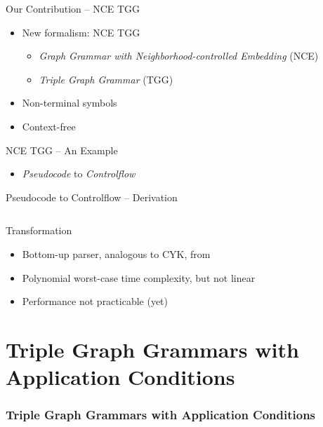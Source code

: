 \documentclass[usenames,dvipsnames]{beamer}
\begin{document}
	\begin{frame}{Our Contribution -- NCE TGG}
		\begin{itemize}
			\item New formalism: NCE TGG
			\begin{itemize}
				\item \emph{Graph Grammar with Neighborhood-controlled Embedding} (NCE) \cite{janssens1982graph}
				\item \emph{Triple Graph Grammar} (TGG) \cite{schurr1994specification}
			\end{itemize}
			\item Non-terminal symbols
			\item Context-free
		\end{itemize}
	\end{frame}
	
	\begin{frame}{NCE TGG -- An Example}
		\begin{itemize}
			\item \emph{Pseudocode} to \emph{Controlflow}
		\end{itemize}
		
		
	\end{frame}
	
	\begin{frame}{Pseudocode to Controlflow -- Derivation}
		\begin{columns}
			\column{\dimexpr\paperwidth-30pt}
			
		\end{columns}
	\end{frame}
	
	\begin{frame}{Transformation}
		
		\vskip 10pt
		\pause
		\begin{itemize}
			\item Bottom-up parser, analogous to CYK, from \cite{rozenberg1986boundary}
			\item Polynomial worst-case time complexity, but not linear
			\item Performance not practicable (yet)
		\end{itemize}
	\end{frame}
	
	\section{Triple Graph Grammars with Application Conditions}
	\begin{frame}
		\frametitle{Triple Graph Grammars with Application Conditions}
	\end{frame}
	
\end{document}
